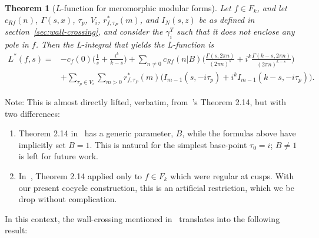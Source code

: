 \documentclass[11pt]{article}
\newtheorem{theorem}{Theorem}[section]
\numberwithin{equation}{section}  %
\begin{document}
\begin{theorem}[$L$-function for meromorphic modular forms]\label{genericLthm}
Let $f \in F_k$, and let $c_{Rf}(n)$, $\Gamma(s,x)$, $\tau_p$, $V_i$, $r^*_{f,\tau_P}(m)$, and $I_N(s,z)$ be as defined in section~\ref{sec:wall-crossing}, and consider the $\gamma^T_i$ such that it does not enclose any pole in $f$. Then the L-integral that yields the L-function is
\begin{align} 
L^*(f, s) =&-c_f(0) \bigg(\frac{1}{s} + \frac{i^k}{k-s} \bigg) + \sum_{n \neq 0} c_{Rf}(n|B) \bigg( \frac{\Gamma(s,2\pi n)}{(2\pi n)^s}  + i^k \frac{\Gamma(k-s,2\pi n)}{(2\pi n)^{k-s}}  \bigg) \nonumber\\
&+\sum_{\tau_p \in V_i} \sum_{m > 0} r^*_{f,\tau_P}(m) \bigg( I_{m-1}(s,-i\tau_p) + i^k I_{m-1}(k-s,-i\tau_p) \bigg).
\label{eqLfn}
\end{align}
\end{theorem}
\noindent Note: This is almost directly lifted, verbatim, from~\cite{1806}'s Theorem 2.14, but with two differences: 
\begin{enumerate}
\item Theorem 2.14 in~\cite{1806} has a generic parameter, $B$, while the formulas above have implicitly set $B = 1$. This is natural for the simplest base-point $\tau_0 = i$; $B \neq 1$ is left for future work.%
\item In~\cite{1806}, Theorem 2.14 applied only to $f \in F_k$ which were regular at cusps. With our present cocycle construction, this is an artificial restriction, which we be drop without complication. 
\end{enumerate}
In this context, the wall-crossing mentioned in~\cite{1806} translates into the following result:
\end{document}
